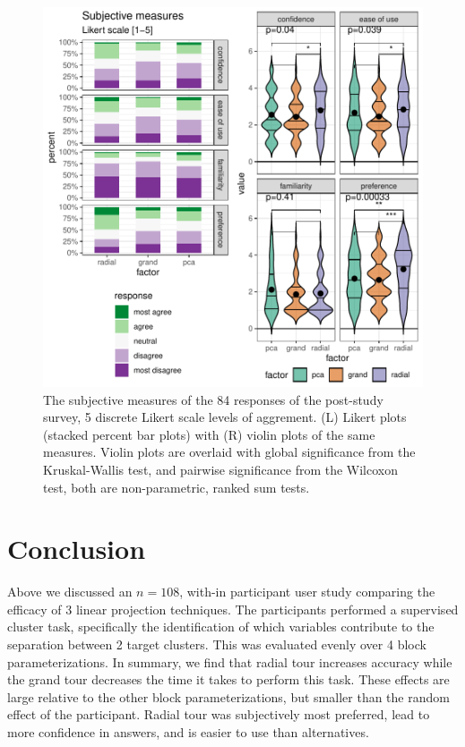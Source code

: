 \documentclass{monashthesis}
\begin{document}
\begin{figure}

{\centering \includegraphics[width=1\linewidth,]{./figures_from_script/ch4_fig6_subjective_measures} 

}

\caption{The subjective measures of the 84 responses of the post-study survey, 5 discrete Likert scale levels of aggrement. (L) Likert plots (stacked percent bar plots) with (R) violin plots of the same measures. Violin plots are overlaid with global significance from the Kruskal-Wallis test, and pairwise significance from the Wilcoxon test, both are non-parametric, ranked sum tests.}\label{fig:ch4fig6}
\end{figure}

\hypertarget{sec:conclusion}{%
\section{Conclusion}\label{sec:conclusion}}

Above we discussed an \(n=108\), with-in participant user study comparing the efficacy of 3 linear projection techniques. The participants performed a supervised cluster task, specifically the identification of which variables contribute to the separation between 2 target clusters. This was evaluated evenly over 4 block parameterizations. In summary, we find that radial tour increases accuracy while the grand tour decreases the time it takes to perform this task. These effects are large relative to the other block parameterizations, but smaller than the random effect of the participant. Radial tour was subjectively most preferred, lead to more confidence in answers, and is easier to use than alternatives.
\end{document}

